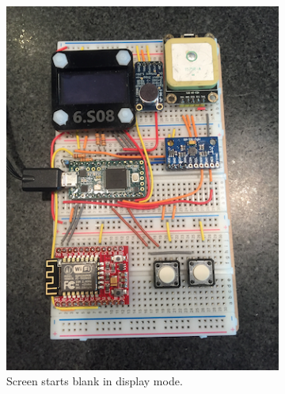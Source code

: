 \documentclass[12pt]{article}
\begin{document}
\begin{figure}
\centering
\begin{subfigure}[b]{.3\linewidth}
\includegraphics[width=\linewidth]{text-blank}
\caption{Screen starts blank in display mode.}
\label{fig:text-blank}
\end{subfigure}
\begin{subfigure}[b]{.3\linewidth}

\end{subfigure}
\end{figure}
\end{document}
